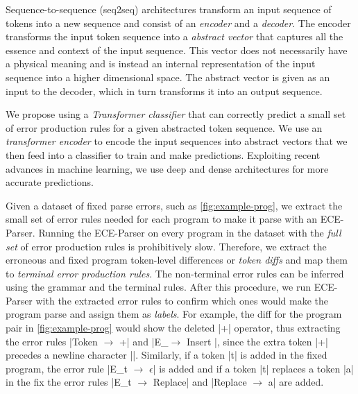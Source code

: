 Sequence-to-sequence (seq2seq) architectures transform an input sequence of
tokens into a new sequence \citep{Sutskever_2014} and consist of an
\emph{encoder} and a \emph{decoder}. The encoder transforms the input token
sequence into a \emph{abstract vector} that captures all the essence and context
of the input sequence. This vector does not necessarily have a physical meaning
and is instead an internal representation of the input sequence into a higher
dimensional space. The abstract vector is given as an input to the decoder,
which in turn transforms it into an output sequence.

We propose using a \emph{Transformer classifier} that can correctly predict a
small set of error production rules for a given abstracted token sequence. We
use an \emph{transformer encoder} to encode the input sequences into abstract
vectors that we then feed into a \emph{\dnn} classifier to train and make
predictions. Exploiting recent advances in machine learning, we use deep and
dense architectures \citep{Schmidhuber_2015} for more accurate predictions.

Given a dataset of fixed parse errors, such as \autoref{fig:example-prog}, we
extract the small set of error rules needed for each program to make it parse
with an ECE-Parser. Running the ECE-Parser on every program in the dataset with
the \emph{full set} of error production rules is prohibitively slow. Therefore,
we extract the erroneous and fixed program token-level differences or
\emph{token diffs} and map them to \emph{terminal error production rules}. The
non-terminal error rules can be inferred using the grammar and the terminal
rules. After this procedure, we run ECE-Parser with the extracted error rules to
confirm which ones would make the program parse and assign them as
\emph{labels}. For example, the diff for the program pair in
\autoref{fig:example-prog} would show the deleted |+| operator, thus extracting
the error rules |Token $\rightarrow$ +| and |E_\n $\rightarrow$ Insert \n|,
since the extra token |+| precedes a newline character |\n|. Similarly, if a
token |t| is added in the fixed program, the error rule
%
|E_t $\rightarrow$ $\epsilon$| is added and if a token |t| replaces a token |a|
in the fix the error rules |E_t $\rightarrow$ Replace| and
%
|Replace $\rightarrow$ a| are added.

